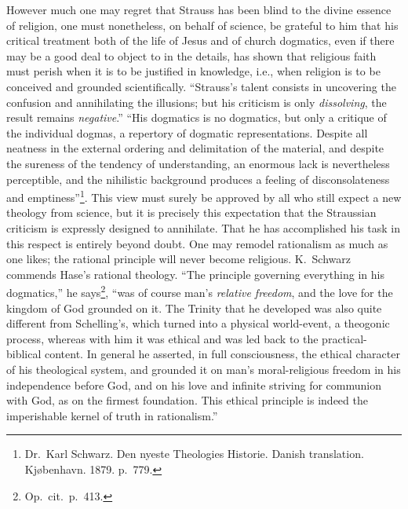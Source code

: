 \documentclass[12pt,a4paper]{article}
\newcommand{\opage}[1]{\marginnote{\footnotesize\textit{[#1]}}}
\begin{document}
However much one may regret that Strauss has been blind to the divine
essence of religion, one must nonetheless, on behalf of science, be grateful
to him that his critical treatment both of the life of Jesus and of church
dogmatics, even if there may be a good deal to object to in the details, has
shown that religious faith must perish when it is to be justified in
knowledge, i.e., when religion is to be conceived and grounded
scientifically. ``Strauss's talent consists in uncovering
\opage{32}the confusion and annihilating the illusions; but his criticism is only
\emph{dissolving}, the result remains \emph{negative}.'' ``His dogmatics is
no dogmatics, but only a critique of the individual dogmas, a repertory of
dogmatic representations. Despite all neatness in the external ordering and
delimitation of the material, and despite the sureness of the tendency of
understanding, an enormous lack is nevertheless perceptible, and the
nihilistic background produces a feeling of disconsolateness and
emptiness''\footnote{Dr.\ Karl Schwarz. Den nyeste Theologies Historie. Danish
translation. Kjøbenhavn. 1879. p.\ 779.}. %
This view must surely be approved by all who still expect a new theology
from science, but it is precisely this expectation that the Straussian
criticism is expressly designed to annihilate. That he has accomplished his
task in this respect is entirely beyond doubt. One may remodel rationalism
as much as one likes; the rational principle will never become religious.
K.\ Schwarz commends Hase's rational theology. ``The principle governing
everything in his dogmatics,'' he says\footnote{Op.\ cit.\ p.\ 413.}, %
``was of course man's \emph{relative freedom}, and the love for the kingdom
of God grounded on it. The Trinity that he developed was also quite
different from Schelling's, which turned into a physical world-event, a
theogonic process, whereas with him it was ethical and was led back to the
practical-biblical content. In general he asserted, in full consciousness,
the ethical character of his theological system, and grounded it on man's
moral-religious freedom in his independence before God, and on his love and
infinite striving for communion with God, as on the firmest foundation. This
ethical principle is indeed the imperishable kernel of truth in
rationalism.''
\end{document}
